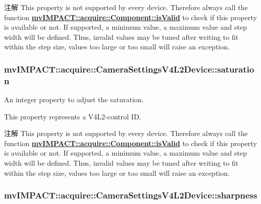 \begin{DoxyNote}{注解}
This property is not supported by every device. Therefore always call the function {\bfseries \hyperlink{classmv_i_m_p_a_c_t_1_1acquire_1_1_component_ac51e55e7e046101f3c6119d84123abd5}{mv\+I\+M\+P\+A\+C\+T\+::acquire\+::\+Component\+::is\+Valid}} to check if this property is available or not. If supported, a minimum value, a maximum value and step width will be defined. Thus, invalid values may be tuned after writing to fit within the step size, values too large or too small will raise an exception. 
\end{DoxyNote}
\hypertarget{classmv_i_m_p_a_c_t_1_1acquire_1_1_camera_settings_v4_l2_device_a9d333663c3d74234ce3e5fadb8aec691}{
\subsubsection[{saturation}]{ mv\+I\+M\+P\+A\+C\+T\+::acquire\+::\+Camera\+Settings\+V4\+L2\+Device\+::saturation}}\label{classmv_i_m_p_a_c_t_1_1acquire_1_1_camera_settings_v4_l2_device_a9d333663c3d74234ce3e5fadb8aec691}


An integer property to adjust the saturation. 

This property represents a V4\+L2-\/control I\+D. \begin{DoxyNote}{注解}
This property is not supported by every device. Therefore always call the function {\bfseries \hyperlink{classmv_i_m_p_a_c_t_1_1acquire_1_1_component_ac51e55e7e046101f3c6119d84123abd5}{mv\+I\+M\+P\+A\+C\+T\+::acquire\+::\+Component\+::is\+Valid}} to check if this property is available or not. If supported, a minimum value, a maximum value and step width will be defined. Thus, invalid values may be tuned after writing to fit within the step size, values too large or too small will raise an exception. 
\end{DoxyNote}
\hypertarget{classmv_i_m_p_a_c_t_1_1acquire_1_1_camera_settings_v4_l2_device_a419f22340e59abd6212131fde87ae98f}{
\subsubsection[{sharpness}]{ mv\+I\+M\+P\+A\+C\+T\+::acquire\+::\+Camera\+Settings\+V4\+L2\+Device\+::sharpness}}\label{classmv_i_m_p_a_c_t_1_1acquire_1_1_camera_settings_v4_l2_device_a419f22340e59abd6212131fde87ae98f}


